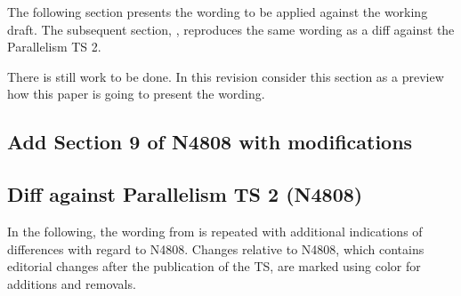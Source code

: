 The following section presents the wording to be applied against the \CC{}
working draft.
The subsequent section, , reproduces the same wording as a diff
against the Parallelism TS 2.

There is still work to be done.
In this revision consider this section as a preview how this paper is going to
present the wording.

\subsection{Add Section 9 of N4808 with modifications}\label{sec:wording}

\begin{wgText}
  \def\wgRem#1{}
  \newsavebox{\wgVoid}
  \def\wgAdd#1{#1}
  \def\wgChange#1#2{#2}
  \def\diffbreak#1{}
  \setcounter{WGClause}{28}
  \setcounter{WGSubSection}{8}
  
\end{wgText}

\subsection{Diff against Parallelism TS 2 (N4808)}\label{sec:diff}

In the following, the wording from  is repeated with additional indications of differences with regard to N4808.
Changes relative to N4808, which contains editorial changes after the publication of the TS, are marked using color for \textcolor{WgAdd}{additions} and \textcolor{WgRem}{removals}.

\def\wgLabelPrefix{diff}%
\begin{wgText}
  \setcounter{WGClause}{28}
  \setcounter{WGSubSection}{8}
  \makeatletter
  \let\@tmp@seebelow=\seebelow
  \def\seebelow{\mbox{\@tmp@seebelow}}
  \let\@tmp@impdef=\impdef
  \def\impdef{\mbox{\@tmp@impdef}}
    \newcount\diffbreak@count
    \def\diffbreak#1{
      \\\diffbreak@count=\z@%
      \hbox{\@whilenum\diffbreak@count<#1\do{\ \advance\diffbreak@count\@ne}}%
    }
  \makeatother
  
\end{wgText}
